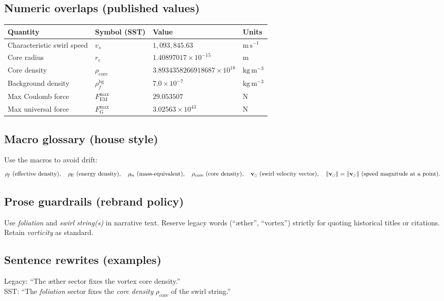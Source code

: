 \documentclass[11pt]{article}
\newcommand{\swirlarrow}{%
	\mathchoice{\mkern-2mu\scriptstyle\boldsymbol{\circlearrowleft}}%
	{\mkern-2mu\scriptstyle\boldsymbol{\circlearrowleft}}%
	{\mkern-2mu\scriptscriptstyle\boldsymbol{\circlearrowleft}}%
	{\mkern-2mu\scriptscriptstyle\boldsymbol{\circlearrowleft}}%
}
\newcommand{\vswirl}{\mathbf{v}_{\swirlarrow}}
\newcommand{\vscore}{v_s}                                %
\newcommand{\vnorm}{\lVert \mathbf{v}_{\mkern-2mu\scriptscriptstyle\boldsymbol{\circlearrowleft}} \rVert}               %
\newcommand{\rhoF}{\rho_{\!f}}                           %
\newcommand{\rhoE}{\rho_{\!E}}                           %
\newcommand{\rhoM}{\rho_{\!m}}                           %
\newcommand{\rhoC}{\rho_{\mathrm{core}}} %
\newcommand{\FmaxEM}{F_{\mathrm{EM}}^{\max}}             %
\newcommand{\FmaxG}{F_{\mathrm{G}}^{\max}}               %
\begin{document}
	\subsection*{Numeric overlaps (published values)}
		\begin{center}
			\begin{tabular}{llll}
				\hline
				\textbf{Quantity} & \textbf{Symbol (SST)} & \textbf{Value} & \textbf{Units} \\
				\hline
				Characteristic swirl speed & $\vscore$ & $1{,}093{,}845.63$ & $\mathrm{m\,s^{-1}}$ \\
				Core radius & $r_c$ & $1.40897017\times 10^{-15}$ & $\mathrm{m}$ \\
				Core density & $\rhoC$ & $3.8934358266918687\times 10^{18}$ & $\mathrm{kg\,m^{-3}}$ \\
				Background density & $\rhoF^{\mathrm{bg}}$ & $7.0\times 10^{-7}$ & $\mathrm{kg\,m^{-3}}$ \\
				Max Coulomb force & $\FmaxEM$ & $29.053507$ & $\mathrm{N}$ \\
				Max universal force & $\FmaxG$ & $3.02563\times 10^{43}$ & $\mathrm{N}$ \\
				\hline
			\end{tabular}
		\end{center}

	\subsection*{Macro glossary (house style)}
		Use the macros to avoid drift:
		\[
			\rhoF\ (\text{effective density}),\quad
			\rhoE\ (\text{energy density}),\quad
			\rhoM\ (\text{mass-equivalent}),\quad
			\rhoC\ (\text{core density}),\quad
            \vswirl\ (\text{swirl velocity vector}),\quad
            \vnorm=\lVert\vswirl\rVert\ (\text{speed magnitude at a point}) .
		\]

	\subsection*{Prose guardrails (rebrand policy)}
		Use \emph{foliation} and \emph{swirl string(s)} in narrative text. Reserve legacy words (``æther'', ``vortex'') strictly for quoting historical titles or citations. Retain \emph{vorticity} as standard.

	\subsection*{Sentence rewrites (examples)}
		Legacy: “The æther sector fixes the vortex core density.”\\
		SST: “The \emph{foliation} sector fixes the \emph{core density} $\rhoC$ of the swirl string.”
\end{document}
